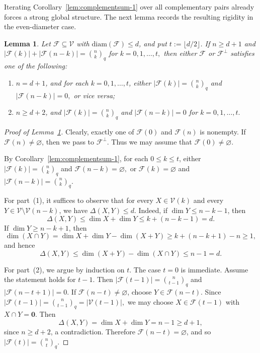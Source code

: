 \documentclass[11pt]{article}
\newtheorem{lemma}[theorem]{Lemma}
\theoremstyle{definition}
\newcommand{\qbinom}[2]{\genfrac{(}{)}{0pt}{}{#1}{#2}_q}
\newcommand{\diam}{\mathrm{diam}}
\begin{document}
Iterating Corollary~\ref{lem:complementsum-1} over all complementary pairs already forces a strong global structure. 
The next lemma records the resulting rigidity in the even-diameter case.

\begin{lemma}\label{lem:equality}
Let $\mathcal{F} \subseteq \mathcal{V}$ with $\diam(\mathcal{F}) \le d$, and put \(t:=\lfloor d/2\rfloor\).
If $n\ge d+1$ and
\(
|\mathcal{F}(k)|+|\mathcal{F}(n-k)|=\qbinom{n}{k}\)
for \(k=0,1,\ldots,t,\)
then either $\mathcal{F}$ or $\mathcal{F}^\perp$ satisfies one of the following:
\begin{enumerate}
\item[\textup{(1)}]
$n=d+1$, and for each $k=0,1,\ldots,t$, either
\(
|\mathcal{F}(k)|=\qbinom{n}{k}\)
and \(
|\mathcal{F}(n-k)|=0,
\)
or vice versa;

\item[\textup{(2)}]
$n\ge d+2$, and
\(
|\mathcal{F}(k)|=\qbinom{n}{k}\)
and
\(
|\mathcal{F}(n-k)|=0
\)
for \(k=0,1,\ldots,t.\)
\end{enumerate}
\end{lemma}

\begin{proof}[Proof of Lemma~\ref{lem:equality}]
Clearly, exactly one of $\mathcal{F}(0)$ and $\mathcal{F}(n)$ is nonempty. 
If $\mathcal{F}(n)\neq \varnothing$, then we pass to $\mathcal{F}^\perp$. 
Thus we may assume that $\mathcal{F}(0)\neq \varnothing$.

By Corollary~\ref{lem:complementsum-1}, for each $0\le k\le t$, either
\(
|\mathcal{F}(k)|=\qbinom{n}{k}\)
and \(
\mathcal{F}(n-k)=\varnothing,
\)
or
\(
\mathcal{F}(k)=\varnothing\) and
\(
|\mathcal{F}(n-k)|=\qbinom{n}{k}.
\)

For part~(1), it suffices to observe that for every $X\in \mathcal{V}(k)$ and every $Y\in \mathcal{V}\setminus \mathcal{V}(n-k)$, we have $\Delta(X,Y)\le d$. 
Indeed, if $\dim Y\le n-k-1$, then
\[
\Delta(X,Y)\le \dim X+\dim Y\le k+(n-k-1)=d.
\]
If $\dim Y\ge n-k+1$, then
\[
\dim(X\cap Y)
=
\dim X+\dim Y-\dim(X+Y)
\ge
k+(n-k+1)-n
\ge 1,
\]
and hence
\[
\Delta(X,Y)
\le
\dim(X+Y)-\dim(X\cap Y)
\le n-1=d.
\]

For part~(2), we argue by induction on $t$. 
The case $t=0$ is immediate. 
Assume the statement holds for $t-1$. Then
\(
|\mathcal{F}(t-1)|=\qbinom{n}{t-1}\)
and
\(
|\mathcal{F}(n-t+1)|=0.
\)
If $\mathcal{F}(n-t)\neq \varnothing$, choose $Y\in \mathcal{F}(n-t)$. Since
\(
|\mathcal{F}(t-1)|=\qbinom{n}{t-1}=|\mathcal{V}(t-1)|,
\)
we may choose $X\in \mathcal{F}(t-1)$ with $X\cap Y= \boldsymbol 0$. Then
\[
\Delta(X,Y)=\dim X+\dim Y=n-1\ge d+1,
\]
since $n\ge d+2$, a contradiction. Therefore $\mathcal{F}(n-t)=\varnothing$, and so
\(
|\mathcal{F}(t)|=\qbinom{n}{t}.
\)
\qedhere
\end{proof}
\end{document}
